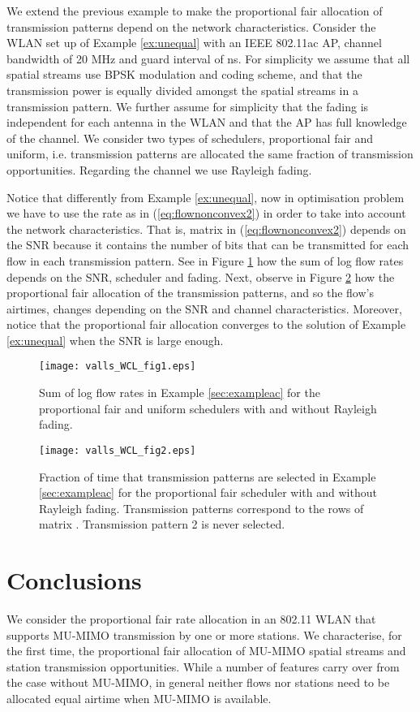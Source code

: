 \documentclass[11pt]{amsart}
\begin{document}
We extend the previous example to make the proportional fair allocation of transmission patterns depend on the network characteristics. Consider the WLAN set up of Example \ref{ex:unequal} with an IEEE 802.11ac AP,  channel bandwidth of 20 MHz and guard interval of  ns. For simplicity we assume that all spatial streams use BPSK  modulation and coding scheme, and that the transmission power is equally divided amongst the spatial streams in a transmission pattern. We further assume for simplicity that the fading is independent for each antenna in the WLAN and that the AP has full knowledge of the channel. We consider two types of schedulers, proportional fair and uniform, i.e. transmission patterns are allocated the same fraction of transmission opportunities. Regarding the channel we use Rayleigh fading.

Notice that differently from Example \ref{ex:unequal}, now in optimisation problem  we have to use the rate as in (\ref{eq:flownonconvex2}) in order to take into account the network characteristics. That is, matrix  in (\ref{eq:flownonconvex2}) depends on the SNR because it contains the number of bits that can be transmitted for each flow in each transmission pattern. See in Figure \ref{fig:rate} how the sum of log flow rates depends on the SNR, scheduler and fading. Next, observe in Figure \ref{fig:time} how the proportional fair allocation of the transmission patterns, and so the flow's airtimes, changes depending on the SNR and channel characteristics. Moreover, notice that the proportional fair allocation converges to the solution of Example \ref{ex:unequal} when the SNR is large enough. 

\begin{figure}
\centering
\texttt{[image: valls\_WCL\_fig1.eps]}
\caption{Sum of log flow rates in Example \ref{sec:exampleac} for the proportional fair and uniform schedulers with and without Rayleigh fading.}
\label{fig:rate}
\end{figure}

\begin{figure}
\centering
\texttt{[image: valls\_WCL\_fig2.eps]}
\caption{Fraction of time that transmission patterns are selected in Example \ref{sec:exampleac} for the proportional fair scheduler with and without Rayleigh fading. Transmission patterns correspond to the rows of matrix . Transmission pattern 2 is never selected.}
\label{fig:time}
\end{figure}


\section{Conclusions}
We consider the proportional fair rate allocation in an 802.11 WLAN that supports MU-MIMO transmission by one or more stations.   We characterise, for the first time, the proportional fair allocation of MU-MIMO spatial streams and station transmission opportunities.  While a number of features carry over from the case without MU-MIMO, in general neither flows nor stations need to be allocated equal airtime when MU-MIMO is available.



\end{document}
